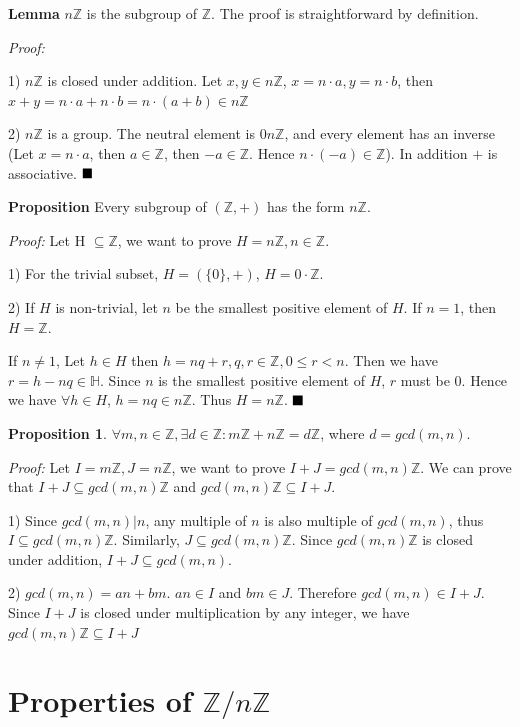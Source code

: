 \documentclass{article}
\theoremstyle{definition}
\newtheorem{proposition}{Proposition}[section]
\begin{document}
\textbf{Lemma}
$n\mathbb{Z}$ is the subgroup of $\mathbb{Z}$. The proof is straightforward by definition.

\textit{Proof:} 

1) $n\mathbb{Z}$ is closed under addition. Let $x,y \in n\mathbb{Z}$, $x=n\cdot a, y=n\cdot b$, then $x+y = n\cdot a + n\cdot b=n\cdot(a+b) \in n\mathbb{Z}$
    
2) $n\mathbb{Z}$ is a group. The neutral element is $0 n\mathbb{Z}$, and every element has an inverse (Let $x=n\cdot a$, then $a\in \mathbb{Z}$, then $-a \in \mathbb{Z}$. Hence $n\cdot(-a) \in \mathbb{Z}$). In addition $+$ is associative. $\hfill\blacksquare$

\textbf{Proposition}
Every subgroup of $(\mathbb{Z}, +)$ has the form $n\mathbb{Z}$.


\textit{Proof:} Let H $\subseteq \mathbb{Z}$, we want to prove $H=n\mathbb{Z}, n \in \mathbb{Z}$.

1) For the trivial subset, $H=(\{0\}, +)$, $H=0\cdot \mathbb{Z}$.

2) If $H$ is non-trivial, let $n$ be the smallest positive element of $H$. If $n=1$, then $H=\mathbb{Z}$.

If $n\neq1$, Let $h\in H$ then $h=nq+r, q,r \in \mathbb{Z}, 0\leq r<n$. Then we have $r=h-nq \in \mathbb{H}$. Since $n$ is the smallest positive element of $H$, $r$ must be $0$. Hence we have $\forall h \in H$, $h=nq \in n\mathbb{Z}$. Thus $H=n\mathbb{Z}$. $\hfill\blacksquare$

\begin{proposition}
$\forall m,n \in \mathbb{Z}, \exists d\in \mathbb{Z}: m\mathbb{Z} + n\mathbb{Z}=d\mathbb{Z}$, where $d=gcd(m,n)$.
\end{proposition}

\textit{Proof:} Let $I=m\mathbb{Z}, J=n\mathbb{Z}$, we want to prove $I+J = gcd(m,n)\mathbb{Z}$. We can prove that $I+J \subseteq gcd(m,n)\mathbb{Z}$ and $gcd(m,n)\mathbb{Z}\subseteq I+J$.

1) Since $gcd(m,n)|n$, any multiple of $n$ is also multiple of $gcd(m,n)$, thus $I \subseteq gcd(m,n)\mathbb{Z}$. Similarly, $J \subseteq gcd(m,n)\mathbb{Z}$. Since $gcd(m,n)\mathbb{Z}$ is closed under addition, $I+J \subseteq gcd(m,n)$.

2) $gcd(m,n) = an+bm$. $an \in I$ and $bm \in J$. Therefore $gcd(m,n) \in I+J$. Since $I+J$ is closed under multiplication by any integer, we have $gcd(m,n)\mathbb{Z} \subseteq I+J$ 


\section{Properties of $\mathbb{Z}/n\mathbb{Z}$}
\end{document}

